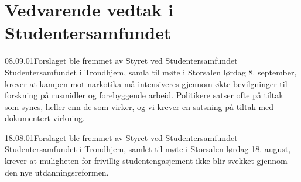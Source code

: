 \chapter{Vedvarende vedtak i Studentersamfundet}

\begin{vedtak}{08.09.01}{Forslaget ble fremmet av Styret ved Studentersamfundet}
Studentersamfundet i Trondhjem, samla til møte i Storsalen lørdag 8. september, krever at kampen mot narkotika må
intensiveres gjennom økte bevilgninger til forskning på rusmidler og forebyggende arbeid. Politikere satser ofte på
tiltak som synes, heller enn de som virker, og vi krever en satsning på tiltak med dokumentert virkning.
\end{vedtak}


\begin{vedtak}{18.08.01}{Forslaget ble fremmet av Styret ved Studentersamfundet}
Studentersamfundet i Trondhjem, samlet til møte i Storsalen lørdag 18. august, krever at muligheten for frivillig
studentengasjement ikke blir svekket gjennom den nye utdanningsreformen.
\end{vedtak}


